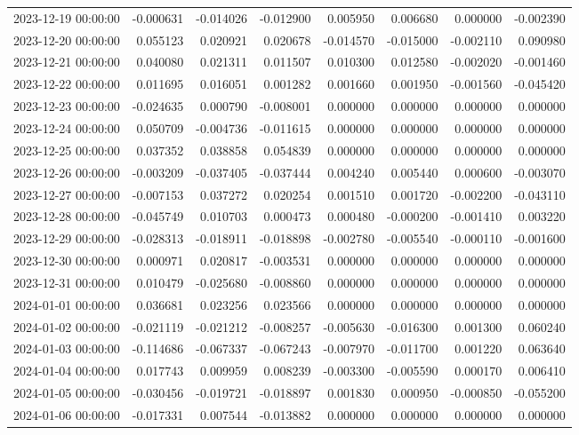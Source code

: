 \begin{tabular}{lrrrrrrr}
2023-12-19 00:00:00 & -0.000631 & -0.014026 & -0.012900 & 0.005950 & 0.006680 & 0.000000 & -0.002390 \\
2023-12-20 00:00:00 & 0.055123 & 0.020921 & 0.020678 & -0.014570 & -0.015000 & -0.002110 & 0.090980 \\
2023-12-21 00:00:00 & 0.040080 & 0.021311 & 0.011507 & 0.010300 & 0.012580 & -0.002020 & -0.001460 \\
2023-12-22 00:00:00 & 0.011695 & 0.016051 & 0.001282 & 0.001660 & 0.001950 & -0.001560 & -0.045420 \\
2023-12-23 00:00:00 & -0.024635 & 0.000790 & -0.008001 & 0.000000 & 0.000000 & 0.000000 & 0.000000 \\
2023-12-24 00:00:00 & 0.050709 & -0.004736 & -0.011615 & 0.000000 & 0.000000 & 0.000000 & 0.000000 \\
2023-12-25 00:00:00 & 0.037352 & 0.038858 & 0.054839 & 0.000000 & 0.000000 & 0.000000 & 0.000000 \\
2023-12-26 00:00:00 & -0.003209 & -0.037405 & -0.037444 & 0.004240 & 0.005440 & 0.000600 & -0.003070 \\
2023-12-27 00:00:00 & -0.007153 & 0.037272 & 0.020254 & 0.001510 & 0.001720 & -0.002200 & -0.043110 \\
2023-12-28 00:00:00 & -0.045749 & 0.010703 & 0.000473 & 0.000480 & -0.000200 & -0.001410 & 0.003220 \\
2023-12-29 00:00:00 & -0.028313 & -0.018911 & -0.018898 & -0.002780 & -0.005540 & -0.000110 & -0.001600 \\
2023-12-30 00:00:00 & 0.000971 & 0.020817 & -0.003531 & 0.000000 & 0.000000 & 0.000000 & 0.000000 \\
2023-12-31 00:00:00 & 0.010479 & -0.025680 & -0.008860 & 0.000000 & 0.000000 & 0.000000 & 0.000000 \\
2024-01-01 00:00:00 & 0.036681 & 0.023256 & 0.023566 & 0.000000 & 0.000000 & 0.000000 & 0.000000 \\
2024-01-02 00:00:00 & -0.021119 & -0.021212 & -0.008257 & -0.005630 & -0.016300 & 0.001300 & 0.060240 \\
2024-01-03 00:00:00 & -0.114686 & -0.067337 & -0.067243 & -0.007970 & -0.011700 & 0.001220 & 0.063640 \\
2024-01-04 00:00:00 & 0.017743 & 0.009959 & 0.008239 & -0.003300 & -0.005590 & 0.000170 & 0.006410 \\
2024-01-05 00:00:00 & -0.030456 & -0.019721 & -0.018897 & 0.001830 & 0.000950 & -0.000850 & -0.055200 \\
2024-01-06 00:00:00 & -0.017331 & 0.007544 & -0.013882 & 0.000000 & 0.000000 & 0.000000 & 0.000000 \\

\end{tabular}
